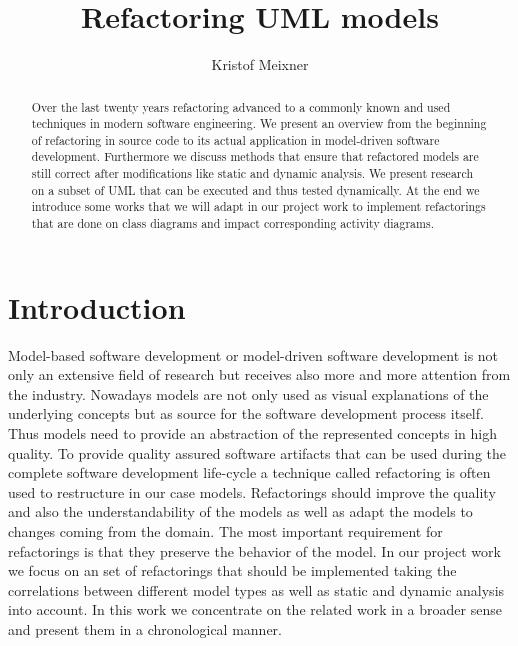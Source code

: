 \documentclass{llncs}
\begin{document}
\pagestyle{plain}

\title{Refactoring UML models}
\author{Kristof Meixner}

\maketitle

\begin{abstract} Over the last twenty years refactoring advanced to a commonly known and used techniques in modern
software engineering. We present an overview from the beginning of refactoring in source code to its actual application
in model-driven software development. Furthermore we discuss methods that ensure that refactored models are still
correct after modifications like static and dynamic analysis. We present research on a subset of UML that can be
executed and thus tested dynamically. At the end we introduce some works that we will adapt in our project work to
implement refactorings that are done on class diagrams and impact corresponding activity diagrams.
\end{abstract}


\tableofcontents
\newpage


\section{Introduction}
\label{sec:intro}

Model-based software development or model-driven software development is not only an extensive field of research but
receives also more and more attention from the industry. Nowadays models are not only used as visual explanations of
the underlying concepts but as source for the software development process itself. Thus models need to provide an abstraction of the
represented concepts in high quality. To provide quality assured software artifacts that can be used during the complete software development
life-cycle a technique called refactoring is often used to restructure in our case models. Refactorings should improve
the quality and also the understandability of the models as well as adapt the models to changes coming from the
domain. The most important requirement for refactorings is that they preserve the behavior of the model. In our project
work we focus on an set of refactorings that should be implemented taking the correlations between different model types
as well as static and dynamic analysis into account. In this work we concentrate on the related work in a broader sense
and present them in a chronological manner.
\end{document}
